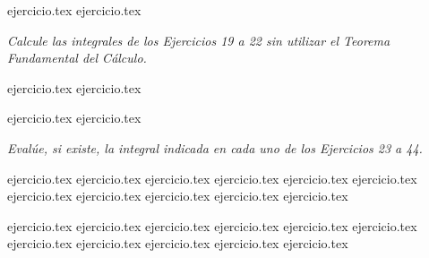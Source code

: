 \vspace{1em}
\begin{enumerate}
    \setcounter{enumi}{16}
    {ejercicio.tex}
    {ejercicio.tex}
\end{enumerate}

\vspace{1em}
\noindent \textit{Calcule las integrales de los Ejercicios 19 a 22 sin utilizar el Teorema Fundamental del Cálculo.}

\begin{enumerate}
    \setcounter{enumi}{18}
    \begin{minipage}{0.45\textwidth}
    {ejercicio.tex}
    {ejercicio.tex}
    \end{minipage}%
    \begin{minipage}{0.45\textwidth}
    {ejercicio.tex}
    {ejercicio.tex}
    \end{minipage}
\end{enumerate}

\vspace{1em}
\noindent \textit{Evalúe, si existe, la integral indicada en cada uno de los Ejercicios 23 a 44.}

\begin{enumerate}
    \setcounter{enumi}{22}
    \begin{minipage}{0.45\textwidth}
    {ejercicio.tex}
    {ejercicio.tex}
    {ejercicio.tex}
    {ejercicio.tex}
    {ejercicio.tex}
    {ejercicio.tex}
    {ejercicio.tex}
    {ejercicio.tex}
    {ejercicio.tex}
    {ejercicio.tex}
    {ejercicio.tex}
    \end{minipage}%
    \begin{minipage}{0.45\textwidth}
    {ejercicio.tex}
    {ejercicio.tex}
    {ejercicio.tex}
    {ejercicio.tex}
    {ejercicio.tex}
    {ejercicio.tex}
    {ejercicio.tex}
    {ejercicio.tex}
    {ejercicio.tex}
    {ejercicio.tex}
    {ejercicio.tex}
    \end{minipage}
\end{enumerate}

